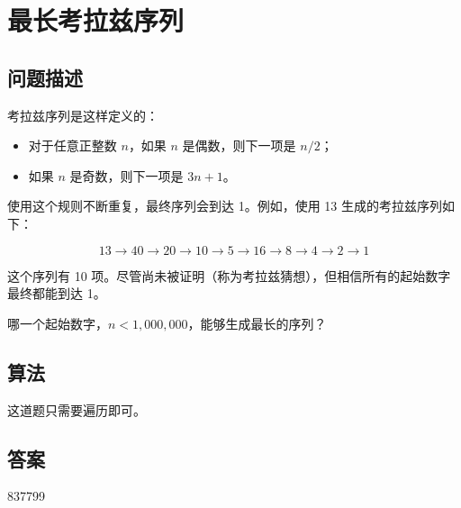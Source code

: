 \section{最长考拉兹序列}
\subsection{问题描述}
\begin{tcolorbox}
考拉兹序列是这样定义的：

\begin{itemize}
    \item 对于任意正整数 $n$，如果 $n$ 是偶数，则下一项是 $n / 2$；
    \item 如果 $n$ 是奇数，则下一项是 $3n + 1$。
\end{itemize}

使用这个规则不断重复，最终序列会到达 1。例如，使用 13 生成的考拉兹序列如下：

\[
13 \to 40 \to 20 \to 10 \to 5 \to 16 \to 8 \to 4 \to 2 \to 1
\]

这个序列有 10 项。尽管尚未被证明（称为考拉兹猜想），但相信所有的起始数字最终都能到达 1。

哪一个起始数字，$n < 1,000,000$，能够生成最长的序列？
\end{tcolorbox}

\subsection{算法}
这道题只需要遍历即可。

\subsection{答案}
837799

